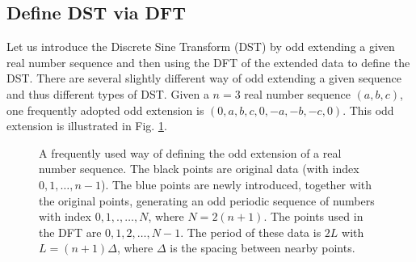 \documentclass{article}
\begin{document}
\subsection{Define DST via DFT}

Let us introduce the Discrete Sine Transform (DST) by odd extending a given
real number sequence and then using the DFT of the extended data to define the
DST. There are several slightly different way of odd extending a given
sequence and thus different types of DST. Given a $n = 3$ real number sequence
$(a, b, c)$, one frequently adopted odd extension is $(0, a, b, c, 0, - a, -
b, - c, 0)$. This odd extension is illustrated in Fig. \ref{18-1-11-e1}.

\begin{figure}[h]
  \caption{\label{18-1-11-e1}A frequently used way of defining the odd
  extension of a real number sequence. The black points are original data
  (with index $0, 1, \ldots, n - 1$). The blue points are newly introduced,
  together with the original points, generating an odd periodic sequence of
  numbers with index $0, 1, ., \ldots, N$, where $N = 2 (n + 1)$. The points
  used in the DFT are $0, 1, 2, \ldots, N - 1$. The period of these data is $2
  L$ with $L = (n + 1) \Delta$, where $\Delta$ is the spacing between nearby
  points.}
\end{figure}
\end{document}
